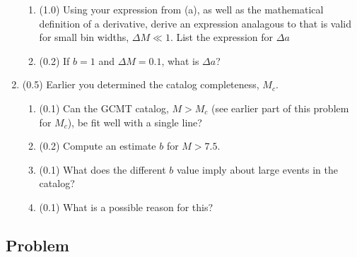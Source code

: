\documentclass[11pt,titlepage,fleqn]{article}
\begin{document}
\begin{enumerate}
\begin{enumerate}

\item (1.0) Using your expression from (a), as well as the mathematical definition of a derivative, derive an expression analagous to  that is valid for small bin widths, $\Delta M \ll 1$. List the expression for $\Delta a$

\item (0.2) If $b = 1$ and $\Delta M = 0.1$, what is $\Delta a$?

\end{enumerate}


\item (0.5) Earlier you determined the catalog completeness, $M_c$.
%
\begin{enumerate}
\item (0.1) Can the GCMT catalog, $M > M_c$ (see earlier part of this problem for $M_c$), be fit well with a single line?
\item (0.2) Compute an estimate $b$ for $M > 7.5$.
\item (0.1) What does the different $b$ value imply about large events in the catalog?
\item (0.1) What is a possible reason for this?
\end{enumerate}

\end{enumerate}


\subsection*{Problem} \howmuchtime\

\pagebreak



\end{document}
